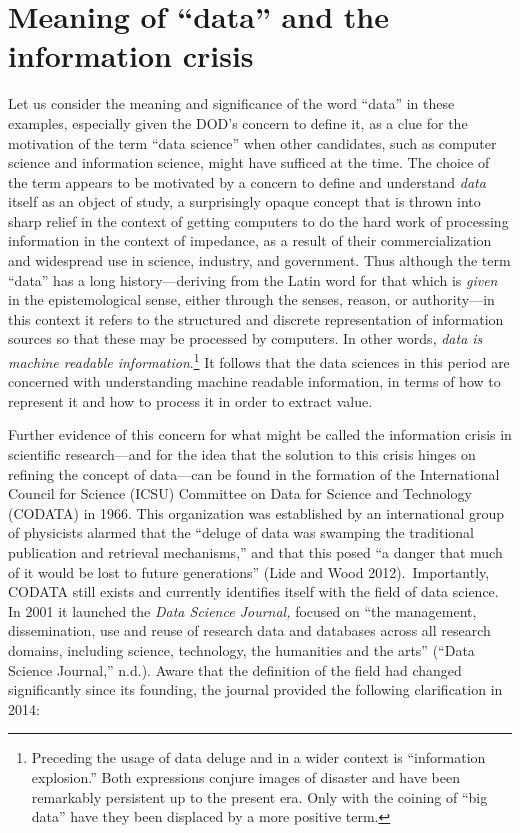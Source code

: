 \documentclass[
  letterpaper,
]{report}
\begin{document}
\hypertarget{meaning-of-data-and-the-information-crisis}{%
\section{Meaning of ``data'' and the information
crisis}\label{meaning-of-data-and-the-information-crisis}}

Let us consider the meaning and significance of the word ``data'' in
these examples, especially given the DOD's concern to define it, as a
clue for the motivation of the term ``data science'' when other
candidates, such as computer science and information science, might have
sufficed at the time. The choice of the term appears to be motivated by
a concern to define and understand \emph{data} itself as an object of
study, a surprisingly opaque concept that is thrown into sharp relief in
the context of getting computers to do the hard work of processing
information in the context of impedance, as a result of their
commercialization and widespread use in science, industry, and
government. Thus although the term ``data'' has a long
history---deriving from the Latin word for that which is \emph{given} in
the epistemological sense, either through the senses, reason, or
authority---in this context it refers to the structured and discrete
representation of information sources so that these may be processed by
computers. In other words, \emph{data is machine readable
information}.\footnote{Preceding the usage of data deluge and in a wider
  context is ``information explosion.'' Both expressions conjure images
  of disaster and have been remarkably persistent up to the present era.
  Only with the coining of ``big data'' have they been displaced by a
  more positive term.} It follows that the data sciences in this period
are concerned with understanding machine readable information, in terms
of how to represent it and how to process it in order to extract value.

Further evidence of this concern for what might be called the
information crisis in scientific research---and for the idea that the
solution to this crisis hinges on refining the concept of data---can be
found in the formation of the International Council for Science (ICSU)
Committee on Data for Science and Technology (CODATA) in 1966. This
organization was established by an international group of physicists
alarmed that the ``deluge of data was swamping the traditional
publication and retrieval mechanisms,'' and that this posed ``a danger
that much of it would be lost to future generations'' (Lide and Wood
2012).~Importantly, CODATA still exists and currently identifies itself
with the field of data science. In 2001 it launched the \emph{Data
Science Journal,} focused on ``the management, dissemination, use and
reuse of research data and databases across all research domains,
including science, technology, the humanities and the arts'' ({``Data
Science Journal,''} n.d.). Aware that the definition of the field had
changed significantly since its founding, the journal provided the
following clarification in 2014:
\end{document}
